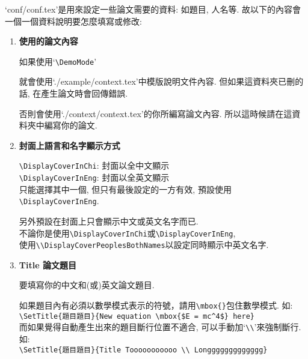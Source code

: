 
`conf/conf.tex'是用來設定一些論文需要的資料: 如題目, 人名等. 故以下的內容會一個一個資料說明要怎麼填寫或修改:

\begin{enumerate}
  \item
  {
    \textbf{使用的論文內容}

    如果使用`\verb|\DemoMode|'

    就會使用`./example/context.tex'中模版說明文件內容. 但如果這資料夾已刪的話, 在產生論文時會回傳錯誤.

    否則會使用`./context/context.tex'的你所編寫論文內容. 所以這時候請在這資料夾中編寫你的論文.
  } %

  \item
  {
    \textbf{封面上語言和名字顯示方式}

    \verb|\DisplayCoverInChi|:  封面以全中文顯示\\
    \verb|\DisplayCoverInEng|:  封面以全英文顯示\\
    只能選擇其中一個, 但只有最後設定的一方有效, 預設使用\verb|\DisplayCoverInEng|.

    另外預設在封面上只會顯示中文或英文名字而已.\\
    不論你是使用\verb|\DisplayCoverInChi|或\verb|\DisplayCoverInEng|,\\
    使用\verb|\\DisplayCoverPeoplesBothNames|以設定同時顯示中英文名字.
  } %

  \item
  {
    \textbf{Title 論文題目}

    要填寫你的中文和(或)英文論文題目.

    如果題目內有必須以數學模式表示的符號，請用\verb|\mbox{}|包住數學模式. 如:\\
    \verb|\SetTitle{題目題目}{New equation \mbox{$E = mc^4$} here}|\\

    而如果覺得自動產生出來的題目斷行位置不適合, 可以手動加`\verb|\\|'來強制斷行. 如:\\
    \verb|\SetTitle{題目題目}{Title Tooooooooooo \\ Longgggggggggggg}|\\

}
\end{enumerate}
